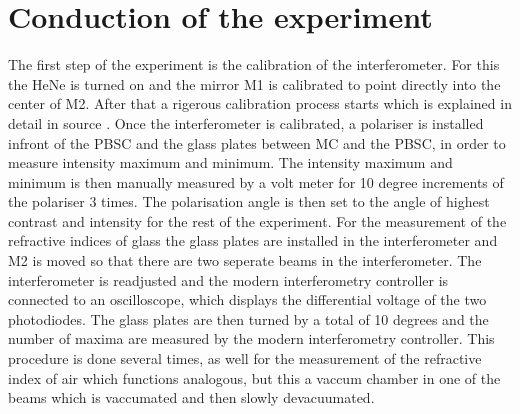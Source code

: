 \section{Conduction of the experiment} 
The first step of the experiment is the calibration of the interferometer. For this the HeNe is turned on and the mirror M1 is calibrated to point directly into the center of M2. After that a rigerous calibration process starts which is explained in detail in source \cite{sample}. Once the interferometer is calibrated, a polariser is installed infront of the PBSC and the glass plates between MC and the PBSC, in order to measure intensity maximum and minimum. The intensity maximum and minimum is then manually measured by a volt meter for 10 degree increments of the polariser 3 times. The polarisation angle is then set to the angle of highest contrast and intensity for the rest of the experiment. For the measurement of the refractive indices of glass the glass plates are installed in the interferometer and M2 is moved so that there are two seperate beams in the interferometer. The interferometer is readjusted and the modern interferometry controller is connected to an oscilloscope, which displays the differential voltage of the two photodiodes. The glass plates are then turned by a total of 10 degrees and the number of maxima are measured by the modern interferometry controller. This procedure is done several times, as well for the measurement of the refractive index of air which functions analogous, but this a vaccum chamber in one of the beams which is vaccumated and then slowly devacuumated. 

\label{sec:cond}
\newpage